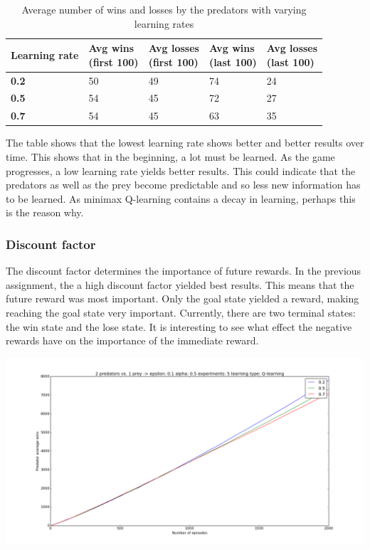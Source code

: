 \begin{table}[H]
\begin{center}
\begin{tabular}{| l | l | l | l | l |}
\hline
\parbox{2cm}{\textbf{Learning rate}} & \parbox{2cm}{\textbf{Avg wins \\ (first 100)}} & \parbox{2cm}{\textbf{Avg losses \\ (first 100)}} & \parbox{2cm}{\textbf{Avg wins \\ (last 100)}} & \parbox{2cm}{\textbf{Avg losses \\ (last 100)}} \\
\hline
\textbf{0.2} & 50 & 49 & 74 & 24 \\
\hline
\textbf{0.5} & 54 & 45 & 72 & 27 \\
\hline
\textbf{0.7} & 54 & 45 & 63 & 35 \\
\hline
\end{tabular}
\caption{Average number of wins and losses by the predators with varying learning rates}
\end{center}
\end{table}

The table shows that the lowest learning rate shows better and better results over time. This shows that in the beginning, a lot must be learned. As the game progresses, a low learning rate yields better results. This could indicate that the predators as well as the prey become predictable and so less new information has to be learned. As minimax Q-learning contains a decay in learning, perhaps this is the reason why. %

\subsubsection{Discount factor}
The discount factor determines the importance of future rewards. In the previous assignment, the a high discount factor yielded best results. This means that the future reward was most important. Only the goal state yielded a reward, making reaching the goal state very important. Currently, there are two terminal states: the win state and the lose state. It is interesting to see what effect the negative rewards have on the importance of the immediate reward.

\begin{center}
	\includegraphics[scale=0.3]{2_predators_discount_factor_q_learning}
\end{center}

